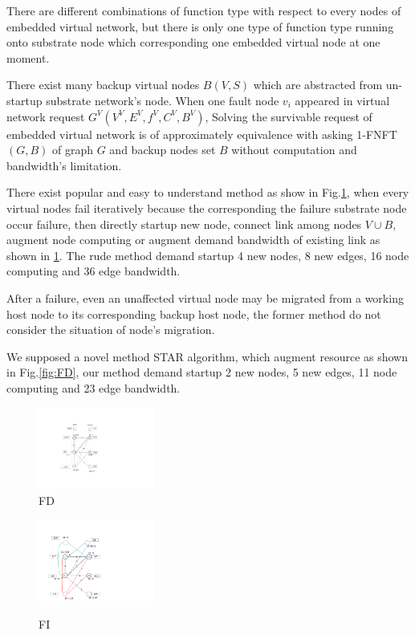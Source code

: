 There are different combinations of function type with respect to  every nodes of embedded virtual network, but there is only one type of function type running onto substrate node which corresponding one embedded virtual node at one moment.

There exist many backup virtual nodes $B(V,S)$ which are abstracted from un-startup substrate network's node. When one fault node $v_i$ appeared in virtual network request $G^V (V^V,E^V,f^V,C^V,B^V)$, Solving the survivable request of embedded virtual network is of approximately equivalence with asking 1-FNFT$(G,B)$ of graph $G$ and backup nodes set $B$ without computation and bandwidth's limitation.

There exist popular and easy to understand method\cite{yeow2011designing} as show in Fig.\ref{fig:FI}, when every virtual nodes fail iteratively because the corresponding the failure substrate node occur failure, then directly startup new node, connect link among nodes $V\cup B$, augment node computing or augment demand bandwidth of existing link as shown in \ref{fig:FI}. The rude method demand startup 4 new nodes, 8 new edges, 16 node computing and 36 edge bandwidth.

After a failure, even an unaffected virtual node may be migrated from a working host node to its corresponding backup host node, the former method\cite{yeow2011designing} do not consider the situation of node's migration.


We supposed a novel method STAR algorithm, which augment resource as shown in Fig.\ref{fig:FD}, our method demand startup 2 new nodes, 5 new edges, 11 node computing and 23 edge bandwidth.

\begin{figure}
\centering
\begin{minipage}[t]{0.4\linewidth}
\centering
\includegraphics[width=1.5in]{Fig/FD}\\
\caption{ FD}\label{fig:FD}
\end{minipage}
\hfill
\begin{minipage}[t]{0.4\linewidth}
\centering
\includegraphics[width=1.5in]{Fig/FI}\\
\caption{FI}\label{fig:FI}
\end{minipage}
\end{figure}




